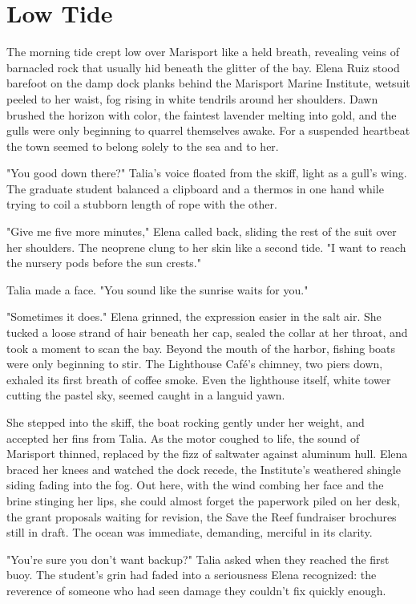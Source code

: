 \chapter{Low Tide}

The morning tide crept low over Marisport like a held breath, revealing veins of barnacled rock that usually hid beneath the glitter of the bay. Elena Ruiz stood barefoot on the damp dock planks behind the Marisport Marine Institute, wetsuit peeled to her waist, fog rising in white tendrils around her shoulders. Dawn brushed the horizon with color, the faintest lavender melting into gold, and the gulls were only beginning to quarrel themselves awake. For a suspended heartbeat the town seemed to belong solely to the sea and to her.

"You good down there?" Talia's voice floated from the skiff, light as a gull's wing. The graduate student balanced a clipboard and a thermos in one hand while trying to coil a stubborn length of rope with the other.

"Give me five more minutes," Elena called back, sliding the rest of the suit over her shoulders. The neoprene clung to her skin like a second tide. "I want to reach the nursery pods before the sun crests."

Talia made a face. "You sound like the sunrise waits for you."

"Sometimes it does." Elena grinned, the expression easier in the salt air. She tucked a loose strand of hair beneath her cap, sealed the collar at her throat, and took a moment to scan the bay. Beyond the mouth of the harbor, fishing boats were only beginning to stir. The Lighthouse Café's chimney, two piers down, exhaled its first breath of coffee smoke. Even the lighthouse itself, white tower cutting the pastel sky, seemed caught in a languid yawn.

She stepped into the skiff, the boat rocking gently under her weight, and accepted her fins from Talia. As the motor coughed to life, the sound of Marisport thinned, replaced by the fizz of saltwater against aluminum hull. Elena braced her knees and watched the dock recede, the Institute's weathered shingle siding fading into the fog. Out here, with the wind combing her face and the brine stinging her lips, she could almost forget the paperwork piled on her desk, the grant proposals waiting for revision, the Save the Reef fundraiser brochures still in draft. The ocean was immediate, demanding, merciful in its clarity.

"You're sure you don't want backup?" Talia asked when they reached the first buoy. The student's grin had faded into a seriousness Elena recognized: the reverence of someone who had seen damage they couldn't fix quickly enough.

